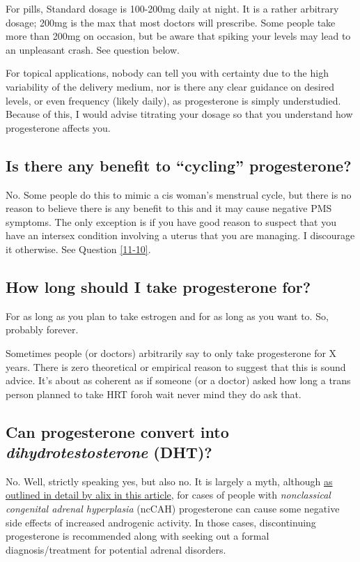 \documentclass{article}
\begin{document}
{{For pills, Standard dosage is 100-200mg daily at night. It is a rather arbitrary dosage; 200mg is the max that most doctors will prescribe. Some people take more than 200mg on occasion, but be aware that spiking your levels may lead to an unpleasant crash. See question below.

For topical applications, nobody can tell you with certainty due to the high variability of the delivery medium, nor is there any clear guidance on desired levels, or even frequency (likely daily), as progesterone is simply understudied. Because of this, I would advise titrating your dosage so that you understand how progesterone affects you.

\subsection{Is there any benefit to “cycling” progesterone?}\label{8-11}

No. Some people do this to mimic a cis woman’s menstrual cycle, but there is no reason to believe there is any benefit to this and it may cause negative PMS symptoms. The only exception is if you have good reason to suspect that you have an intersex condition involving a uterus that you are managing. I discourage it otherwise. See Question \ref{11-10}.

\subsection{How long should I take progesterone for?}

For as long as you plan to take estrogen and for as long as you want to. So, probably forever.

Sometimes people (or doctors) arbitrarily say to only take progesterone for X years. There is zero theoretical or empirical reason to suggest that this is sound advice. It's about as coherent as if someone (or a doctor) asked how long a trans person planned to take HRT for\textemdash{}oh wait never mind they do ask that.

\subsection{Can progesterone convert into \textit{dihydrotestosterone} (DHT)?}

No. Well, strictly speaking yes, but also no. It is largely a myth, although \href{https://whsah.co/posts/rethinking-progesterone-and-androgens/}{as outlined in detail by alix in this article}, for cases of people with \textit{nonclassical congenital adrenal hyperplasia} (ncCAH) progesterone can cause some negative side effects of increased androgenic activity. In those cases, discontinuing progesterone is recommended along with seeking out a formal diagnosis/treatment for potential adrenal disorders.

}}
\end{document}
